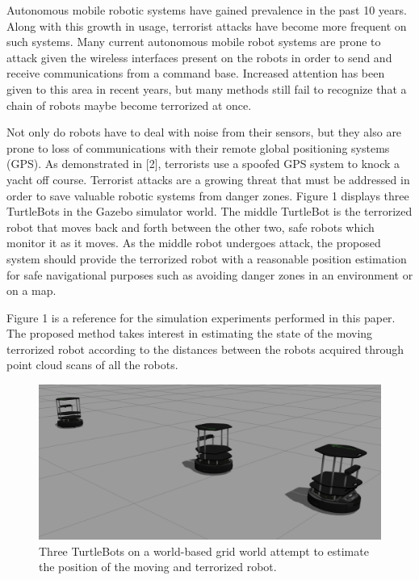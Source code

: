 \documentclass[conference]{IEEEtran}
\begin{document}
Autonomous mobile robotic systems have gained prevalence in the past 10 years. Along with this
growth in usage, terrorist attacks have become more frequent on such systems.
Many current autonomous mobile robot systems are prone to attack given the wireless interfaces present
on the robots in order to send and receive communications from a command base. Increased attention has
been given to this area in recent years, but many methods still fail to recognize that a chain of robots
maybe become terrorized at once.
\par
Not only do robots have to deal with noise from their sensors, but they also are prone to loss of communications
with their remote global positioning systems (GPS). As demonstrated in [2], terrorists use a spoofed GPS system
to knock a yacht off course. Terrorist attacks are a growing threat that must be addressed in order to save
valuable robotic systems from danger zones. Figure 1 displays three TurtleBots in the Gazebo simulator world. The middle
TurtleBot is the terrorized robot that moves back and forth between the other two, safe robots which monitor it as it
moves. As the middle robot undergoes attack, the proposed system should provide the terrorized robot with a reasonable
position estimation for safe navigational purposes such as avoiding danger zones in an environment or on a map.
\par 
Figure 1 is a reference for the simulation experiments performed in this paper. The proposed method takes
interest in estimating the state of the moving terrorized robot according to the distances between the robots acquired
through point cloud scans of all the robots.
\par
\begin{figure}[!ht]
  \centering
    \includegraphics[scale=.2]{sim1}
  \caption{Three TurtleBots on a world-based grid world attempt to estimate the position of the moving and terrorized
robot.}
\end{figure}
\end{document}
